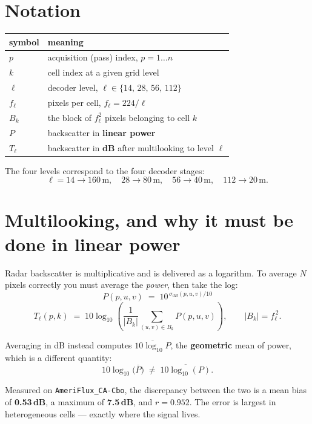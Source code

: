 \documentclass[10pt,a4paper]{article}
\newcommand{\code}[1]{\texttt{\small #1}}
\begin{document}
\section{Notation}

\begin{center}\small
\begin{tabularx}{\linewidth}{lX}
\toprule
symbol & meaning \\
\midrule
$p$ & acquisition (pass) index, $p = 1 \dots n$ \\
$k$ & cell index at a given grid level \\
$\ell$ & decoder level, $\ell \in \{14,\,28,\,56,\,112\}$ \\
$f_\ell$ & pixels per cell, $f_\ell = 224/\ell$ \\
$B_k$ & the block of $f_\ell^2$ pixels belonging to cell $k$ \\
$P$ & backscatter in \textbf{linear power} \\
$T_\ell$ & backscatter in \textbf{dB} after multilooking to level $\ell$ \\
\bottomrule
\end{tabularx}
\end{center}

The four levels correspond to the four decoder stages:
\[
\ell = 14 \to 160\,\mathrm{m}, \quad
28 \to 80\,\mathrm{m}, \quad
56 \to 40\,\mathrm{m}, \quad
112 \to 20\,\mathrm{m}.
\]

\section{Multilooking, and why it must be done in linear power}

Radar backscatter is multiplicative and is delivered as a logarithm. To average $N$ pixels
correctly you must average the \emph{power}, then take the log:
\[
P(p,u,v) \;=\; 10^{\,\sigma_{dB}(p,u,v)/10}
\]
\[
T_\ell(p,k) \;=\; 10\log_{10}\!\left(\frac{1}{|B_k|}\sum_{(u,v)\in B_k} P(p,u,v)\right),
\qquad |B_k| = f_\ell^{\,2}.
\]

Averaging in dB instead computes $\overline{10\log_{10} P}$, the \textbf{geometric} mean of
power, which is a different quantity:
\[
10\log_{10}\!\big(\overline{P}\big) \;\neq\; \overline{10\log_{10}(P)} .
\]

Measured on \code{AmeriFlux\_CA-Cbo}, the discrepancy between the two is a mean bias of
\textbf{0.53\,dB}, a maximum of \textbf{7.5\,dB}, and $r = 0.952$. The error is largest in
heterogeneous cells --- exactly where the signal lives.
\end{document}

